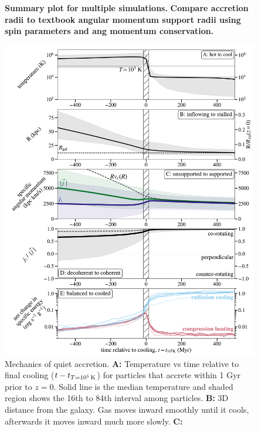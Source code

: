 \documentclass[fleqn,usenatbib]{mnras}
\newcommand{\tcon}{t_{T=10^5\,{\rm K}}}
\begin{document}
\begin{figure}
    \centering
    \caption{
    \textbf{Summary plot for multiple simulations.}
    \textbf{Compare accretion radii to textbook angular momentum support radii using spin parameters and ang momentum conservation.}
    }
    \label{f: r1e5 summary}
\end{figure}

\begin{figure}
\includegraphics[height=0.75\textheight]{figures/before_and_after/before_and_after_m12i_md.pdf}
\caption{
Mechanics of quiet accretion.
\textbf{A:} Temperature vs time relative to final cooling ($t - \tcon$) for particles that accrete within 1 Gyr prior to $z=0$.
Solid line is the median temperature and shaded region shows the 16th to 84th interval among particles.
\textbf{B:}
3D distance from the galaxy.
Gas moves inward smoothly until it cools, afterwards it moves inward much more slowly.
\textbf{C:}
}
\end{figure}
\end{document}
